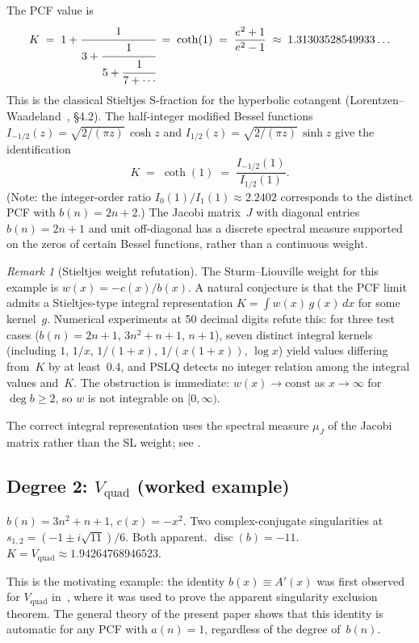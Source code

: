 \documentclass[11pt,a4paper]{amsart}
\theoremstyle{plain}
\theoremstyle{definition}
\theoremstyle{remark}
\newtheorem{remark}[theorem]{Remark}
\newcommand{\disc}{\operatorname{disc}}
\newcommand{\Vquad}{V_{\mathrm{quad}}}
\begin{document}
The PCF value is
\[
  K \;=\; 1 + \cfrac{1}{3 + \cfrac{1}{5 + \cfrac{1}{7+\cdots}}}
  \;=\; \coth(1) \;=\; \frac{e^2+1}{e^2-1}
  \;\approx\; 1.31303528549933\ldots
\]
This is the classical Stieltjes S-fraction for the hyperbolic
cotangent (Lorentzen--Waadeland~\cite{LW92}, \S4.2).
The half-integer modified Bessel functions
$I_{-1/2}(z) = \sqrt{2/(\pi z)}\,\cosh z$ and
$I_{1/2}(z) = \sqrt{2/(\pi z)}\,\sinh z$ give the
identification
\[
  K \;=\; \coth(1) \;=\; \frac{I_{-1/2}(1)}{I_{1/2}(1)}.
\]
(Note: the integer-order ratio $I_0(1)/I_1(1) \approx 2.2402$
corresponds to the distinct PCF with $b(n) = 2n+2$.)
The Jacobi matrix~$J$ with diagonal entries $b(n)=2n+1$ and unit
off-diagonal has a discrete spectral measure supported on the zeros
of certain Bessel functions, rather than a continuous weight.

\begin{remark}[Stieltjes weight refutation]
\label{rem:stieltjes-refutation}
The Sturm--Liouville weight for this example is
$w(x) = -c(x)/b(x)$.  A natural conjecture is that the PCF limit
admits a Stieltjes-type integral representation
$K = \int w(x)\,g(x)\,dx$ for some kernel~$g$.
Numerical experiments at 50 decimal digits refute this:
for three test cases ($b(n) = 2n+1$, $3n^2+n+1$, $n+1$),
seven distinct integral kernels
(including $1$, $1/x$, $1/(1+x)$, $1/(x(1+x))$, $\log x$)
yield values differing from~$K$ by at least~$0.4$,
and PSLQ detects no integer relation among the integral values
and~$K$.  The obstruction is immediate: $w(x) \to \text{const}$
as $x\to\infty$ for $\deg b \ge 2$, so $w$ is not integrable
on $[0,\infty)$.

The correct integral representation uses the spectral measure
$\mu_J$ of the Jacobi matrix rather than the SL weight;
see .
\end{remark}

\subsection{Degree 2: \texorpdfstring{$\Vquad$}{Vquad} (worked example)}

$b(n) = 3n^2+n+1$, $c(x) = -x^2$.  Two complex-conjugate
singularities at $s_{1,2} = (-1 \pm i\sqrt{11})/6$.
Both apparent.  $\disc(b) = -11$.
$K = \Vquad \approx 1.94264768946523$.

This is the motivating example: the identity $b(x) \equiv A'(x)$
was first observed for $\Vquad$ in~\cite{Vquad}, where it was used
to prove the apparent singularity exclusion theorem.  The general
theory of the present paper shows that this identity is automatic
for any PCF with $a(n) = 1$, regardless of the degree of~$b(n)$.
\end{document}
